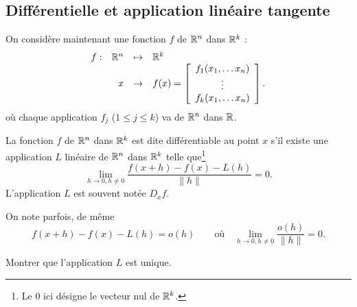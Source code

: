 \bigskip
{}

\subsection{Différentielle et application linéaire tangente} 

On considère maintenant une fonction $f$ de $\mathbb{R}^n$ dans $\mathbb{R}^k$ : 
$$
\begin{array}{rrcl}
  f : & \mathbb{R}^n & \mapsto & \mathbb{R}^k \\
  & x & \rightarrow & f(x) = \left[\begin{array}{c}
      f_1(x_1, \dots x_n) \\ \vdots \\ f_k(x_1, \dots x_n)
    \end{array}\right].
\end{array}
$$
où chaque application $f_j$ ($1 \leq j \leq k$) va de $\mathbb{R}^n$ dans $\mathbb{R}$.

\begin{definition*}[Différentiabilité]
  La fonction $f$ de $\mathbb{R}^n$ dans $\mathbb{R}^k$ est dite différentiable au point $x$ s'il existe une application $L$ linéaire de $\mathbb{R}^n$ dans $\mathbb{R}^k$ telle que\footnote{Le 0 ici désigne le vecteur nul de $\mathbb{R}^k$.}
  $$
  \lim_{h\rightarrow 0, h \neq 0} \frac{f(x+h) - f(x) - L(h)}{\|h\|} = 0.
  $$
  L'application $L$ est souvent notée $D_x f$.
\end{definition*}

\remark
On note parfois, de même 
$$
f(x+h) - f(x) - L(h) = o(h)
\qquad \text{où} \quad
\lim_{h\rightarrow 0, h \neq 0} \frac{o(h)}{\|h\|} = 0.
$$

\begin{exercise*}
  Montrer que l'application $L$ est unique.
\end{exercise*}

